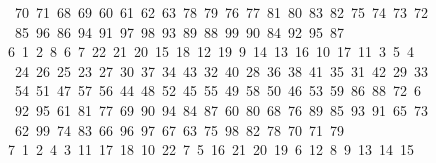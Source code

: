 \begin{tabbing}
\ 70\ 71\ 68\ 69\ 60\ 61\ 62\ 63\ 78\ 79\ 76\ 77\ 81\ 80\ 83\ 82\ 75\ 74\ 73\ 72\\[0pt]
\>\ 85\ 96\ 86\ 94\ 91\ 97\ 98\ 93\ 89\ 88\ 99\ 90\ 84\ 92\ 95\ 87\\[0pt]
6\ 1\ 2\ 8\ 6\ 7\ 22\ 21\ 20\ 15\ 18\ 12\ 19\ 9\ 14\ 13\ 16\ 10\ 17\ 11\ 3\ 5\ 4\\[0pt]
\>\ 24\ 26\ 25\ 23\ 27\ 30\ 37\ 34\ 43\ 32\ 40\ 28\ 36\ 38\ 41\ 35\ 31\ 42\ 29\ 33\ \\[0pt]
\ 54\ 51\ 47\ 57\ 56\ 44\ 48\ 52\ 45\ 55\ 49\ 58\ 50\ 46\ 53\ 59\ 86\ 88\ 72\ 6\\[0pt]
\ 92\ 95\ 61\ 81\ 77\ 69\ 90\ 94\ 84\ 87\ 60\ 80\ 68\ 76\ 89\ 85\ 93\ 91\ 65\ 73\\[0pt]
\>\ 62\ 99\ 74\ 83\ 66\ 96\ 97\ 67\ 63\ 75\ 98\ 82\ 78\ 70\ 71\ 79\\[0pt]
7\ 1\ 2\ 4\ 3\ 11\ 17\ 18\ 10\ 22\ 7\ 5\ 16\ 21\ 20\ 19\ 6\ 12\ 8\ 9\ 13\ 14\ 15\\[0pt]

\end{tabbing}
